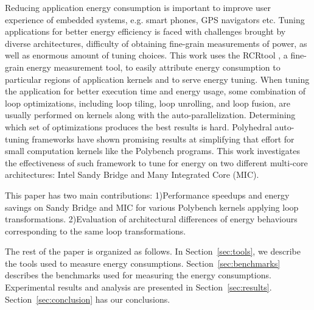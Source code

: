 Reducing application energy consumption is important to improve user experience of 
embedded systems, e.g. smart phones, GPS navigators etc. 
Tuning applications for better energy efficiency is faced with challenges brought by
diverse architectures, difficulty of obtaining fine-grain measurements of power, 
as well as enormous amount of tuning choices.
This work uses the RCRtool \cite{us}, a fine-grain energy measurement tool, to easily attribute energy consumption to particular
regions of application kernels and to serve energy tuning. 
When tuning the application for
better execution time and energy usage, some combination of loop optimizations, including loop 
tiling, loop unrolling, and loop fusion, are usually performed on kernels along with the auto-parallelization.
Determining which set of optimizations produces the best results is hard.
Polyhedral auto-tuning frameworks have shown promising results at simplifying that effort\cite{EJ2012}
for small computation kernels like the Polybench programs. 
This work investigates the effectiveness of such framework to tune for 
energy on two different multi-core architectures: Intel Sandy Bridge
and Many Integrated Core (MIC).
 
This paper has two main contributions: 
1)Performance speedups and energy savings on Sandy Bridge and MIC for 
various Polybench kernels applying loop transformations. 
2)Evaluation of architectural differences of energy behaviours corresponding to the same loop transformations.

The rest of the paper is organized as follows. In Section~\ref{sec:tools}, we describe the tools
used to measure energy consumptions. Section~\ref{sec:benchmarks} describes the benchmarks used for  
measuring the energy consumptions. Experimental results and analysis are presented in Section~\ref{sec:results}. Section~\ref{sec:conclusion} has our conclusions.

